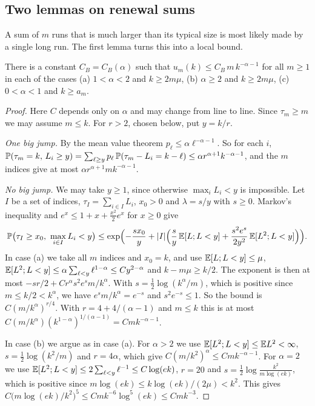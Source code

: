 \subsection{Two lemmas on renewal sums}

A sum of $m$ runs that is much larger than its typical size is most likely
made by a single long run. The first lemma turns this into a local bound.

\begin{lemma}\label{lem:C-bigjump}
There is a constant $C_B=C_B(\alpha)$ such that
$u_m(k)\le C_B\,m\,k^{-\alpha-1}$ for all $m\ge1$ in each of the cases
\textup{(a)} $1<\alpha<2$ and $k\ge2m\mu$, \textup{(b)} $\alpha\ge2$ and
$k\ge2m\mu$, \textup{(c)} $0<\alpha<1$ and $k\ge a_m$.
\end{lemma}

\begin{proof}
Here $C$ depends only on $\alpha$ and may change from line to line. Since
$\tau_m\ge m$ we may assume $m\le k$. For $r>2$, chosen below, put $y=k/r$.

\emph{One big jump.} By the mean value theorem
$p_\ell\le\alpha\ell^{-\alpha-1}$. So for each $i$,
$\mathbb{P}(\tau_m=k,\,L_i\ge y)=\sum_{\ell\ge y}p_\ell\,\mathbb{P}(\tau_m-L_i=k-\ell)
\le\alpha r^{\alpha+1}k^{-\alpha-1}$, and the $m$ indices give at most
$\alpha r^{\alpha+1}mk^{-\alpha-1}$.

\emph{No big jump.} We may take $y\ge1$, since otherwise $\max_iL_i<y$ is
impossible. Let $I$ be a set of indices, $\tau_I=\sum_{i\in I}L_i$, $x_0>0$
and $\lambda=s/y$ with $s\ge0$. Markov's inequality and
$e^x\le1+x+\frac{x^2}2e^x$ for $x\ge0$ give
\begin{equation}\label{eq:C-chernoff}
\mathbb{P}\bigl(\tau_I\ge x_0,\ \max_{i\in I}L_i<y\bigr)
\le\exp\Bigl(-\frac{sx_0}y+\lvert I\rvert\Bigl(\frac sy\,\mathbb{E}[L;L<y]
+\frac{s^2e^s}{2y^2}\,\mathbb{E}[L^2;L<y]\Bigr)\Bigr).
\end{equation}
In case (a) we take all $m$ indices and $x_0=k$, and use $\mathbb{E}[L;L<y]\le\mu$,
$\mathbb{E}[L^2;L<y]\le\alpha\sum_{\ell<y}\ell^{1-\alpha}\le Cy^{2-\alpha}$ and
$k-m\mu\ge k/2$. The exponent is then at most
$-sr/2+Cr^\alpha s^2e^sm/k^\alpha$. With $s=\frac12\log(k^\alpha/m)$, which
is positive since $m\le k/2<k^\alpha$, we have $e^sm/k^\alpha=e^{-s}$ and
$s^2e^{-s}\le1$. So the bound is $C(m/k^\alpha)^{r/4}$. With
$r=4+4/(\alpha-1)$ and $m\le k$ this is at most
$C(m/k^\alpha)(k^{1-\alpha})^{1/(\alpha-1)}=Cmk^{-\alpha-1}$.

In case (b) we argue as in case (a). For $\alpha>2$ we use
$\mathbb{E}[L^2;L<y]\le\mathbb{E} L^2<\infty$,
$s=\frac12\log(k^2/m)$ and $r=4\alpha$, which give
$C(m/k^2)^\alpha\le Cmk^{-\alpha-1}$. For $\alpha=2$ we use
$\mathbb{E}[L^2;L<y]\le2\sum_{\ell<y}\ell^{-1}\le C\log(ek)$, $r=20$ and
$s=\frac12\log\frac{k^2}{m\log(ek)}$, which is positive since
$m\log(ek)\le k\log(ek)/(2\mu)<k^2$. This gives
$C\bigl(m\log(ek)/k^2\bigr)^5\le Cmk^{-6}\log^5(ek)\le Cmk^{-3}$.


\end{proof}
